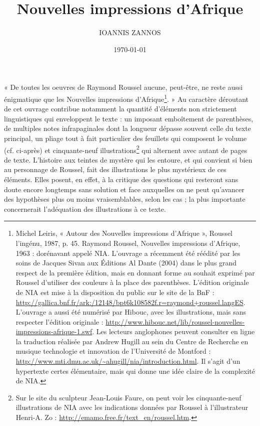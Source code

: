 \documentclass[nofonts]{tufte-handout}
\author{IOANNIS ZANNOS}
\date{\today}
\title{Nouvelles impressions d’Afrique}
\begin{document}
\maketitle



« De toutes les oeuvres de Raymond Roussel aucune, peut-être, ne reste aussi énigmatique que les Nouvelles impressions d’Afrique\footnote{Michel Leiris, « Autour des Nouvelles impressions d’Afrique », Roussel l’ingénu, 1987, p. 45. Raymond Roussel, Nouvelles impressions d’Afrique, 1963 : dorénavant appelé NIA. L’ouvrage a récemment été réédité par les soins de Jacques Sivan aux Éditions Al Dante (2004) dans le plus grand respect de la première édition, mais en donnant forme au souhait exprimé par Roussel d’utiliser des couleurs à la place des parenthèses. L’édition originale de NIA est mise à la disposition du public sur le site de la BnF : \url{http://gallica.bnf.fr/ark:/12148/bpt6k108582f.r=raymond+roussel.langES}. L’ouvrage a aussi été numérisé par Hibouc, avec les illustrations, mais sans respecter l’édition originale : \url{http://www.hibouc.net/lib/roussel-nouvelles-impressions-afrique-1.swf}. Les lecteurs anglophones peuvent consulter en ligne la traduction réalisée par Andrew Hugill au sein du Centre de Recherche en musique technologie et innovation de l’Université de Montford : \url{http://www.mti.dmu.ac.uk/~ahugill/nia/introduction.html}. Il s’agit d’un hypertexte certes élémentaire, mais qui donne une idée claire de la complexité de NIA.}. » Au caractère déroutant de cet ouvrage contribue notamment la quantité d’éléments non strictement linguistiques qui enveloppent le texte : un imposant emboîtement de parenthèses, de multiples notes infrapaginales dont la longueur dépasse souvent celle du texte principal, un pliage tout à fait particulier des feuillets qui composent le volume (cf. ci-après) et cinquante-neuf illustrations\footnote{Sur le site du sculpteur Jean-Louis Faure, on peut voir les cinquante-neuf illustrations de NIA avec les indications données par Roussel à l’illustrateur Henri-A. Zo : \url{http://emamo.free.fr/text_en/roussel.htm}.} qui alternent avec autant de pages de texte. L’histoire aux teintes de mystère qui les entoure, et qui convient si bien au personnage de Roussel, fait des illustrations le plus mystérieux de ces éléments. Elles posent, en effet, à la critique des questions qui resteront sans doute encore longtemps sans solution et face auxquelles on ne peut qu’avancer des hypothèses plus ou moins vraisemblables, selon les cas ; la plus importante concernerait l’adéquation des illustrations à ce texte.
\end{document}
